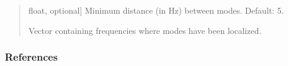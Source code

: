 \documentclass[letterpaper,10pt,english]{sphinxmanual}
\begin{document}
\begin{fulllineitems}
\begin{quote}
\begin{description}
\begin{description}
\sphinxlineitem{\sphinxstylestrong{dist\_hz}}{[}float, optional{]}
\sphinxAtStartPar
Minimum distance (in Hz) between modes. Default: 5.

\end{description}

\begin{description}
\sphinxlineitem{\sphinxstylestrong{f\_modes}}{[}\sphinxtitleref{np.ndarray}{]}
\sphinxAtStartPar
Vector containing frequencies where modes have been localized.

\end{description}

\end{description}\end{quote}
\subsubsection*{References}

\sphinxAtStartPar
{}

\end{fulllineitems}

\end{document}
